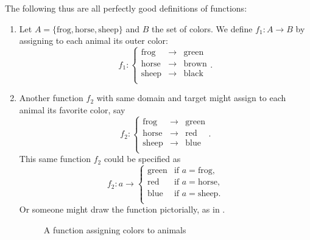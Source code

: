 The following thus are all perfectly good definitions of functions:
\begin{enumerate}
\item  Let $A=\{\mbox{frog},\mbox{horse},\mbox{sheep}\}$ and $B$ the set of
colors. We define $f_1\colon A\to B$ by assigning to each animal its outer
color:
\[
f_1\colon \left\{\begin{array}{lcl}
\mbox{frog}&\to&\mbox{green}\\
\mbox{horse}&\to&\mbox{brown}\\
\mbox{sheep}&\to&\mbox{black}\\
\end{array}
\right..
\]

\item Another function $f_2$ with same domain and target might assign to each animal its favorite color, say
\[
f_2\colon \left\{\begin{array}{lcl}
\mbox{frog}&\to&\mbox{green}\\
\mbox{horse}&\to&\mbox{red}\\
\mbox{sheep}&\to&\mbox{blue}\\
\end{array}
\right..
\]
This same function $f_2$ could be specified as
\[
f_2\colon a\to\left\{\begin{array}{ll}
\mbox{green}&\mbox{if $a=$frog,}\\
\mbox{red}&\mbox{if $a=$horse,}\\
\mbox{blue}&\mbox{if $a=$sheep.}\\
\end{array}
\right.
\]
Or someone might draw the function pictorially, as in
.
\begin{figure}[t]
\begin{center}
\end{center}
\caption{A function assigning colors to animals}
\label{figfroghorsesheep}
\end{figure}


\end{enumerate}
